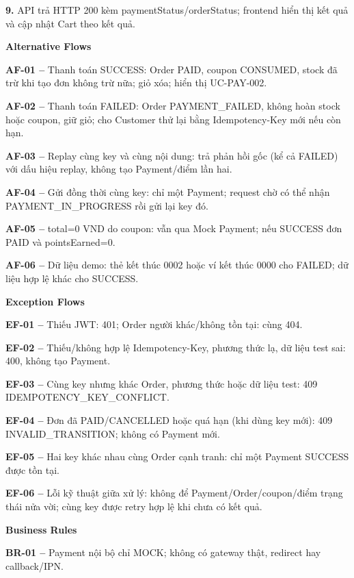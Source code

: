 \documentclass[11pt,a4paper,oneside]{report}
\begin{document}
\textbf{9.} API trả HTTP 200 kèm paymentStatus/orderStatus; frontend hiển thị kết quả và cập nhật Cart theo kết quả.
\par

\par\smallskip\noindent\textcolor{sgublue}{\textbf{Alternative Flows}}\par\nobreak
\textbf{AF-01 --} Thanh toán SUCCESS: Order PAID, coupon CONSUMED, stock đã trừ khi tạo đơn không trừ nữa; giỏ xóa; hiển thị UC-PAY-002.

\textbf{AF-02 --} Thanh toán FAILED: Order PAYMENT\_FAILED, không hoàn stock hoặc coupon, giữ giỏ; cho Customer thử lại bằng Idempotency-Key mới nếu còn hạn.

\textbf{AF-03 --} Replay cùng key và cùng nội dung: trả phản hồi gốc (kể cả FAILED) với dấu hiệu replay, không tạo Payment/điểm lần hai.

\textbf{AF-04 --} Gửi đồng thời cùng key: chỉ một Payment; request chờ có thể nhận PAYMENT\_IN\_PROGRESS rồi gửi lại key đó.

\textbf{AF-05 --} total=0 VND do coupon: vẫn qua Mock Payment; nếu SUCCESS đơn PAID và pointsEarned=0.

\textbf{AF-06 --} Dữ liệu demo: thẻ kết thúc 0002 hoặc ví kết thúc 0000 cho FAILED; dữ liệu hợp lệ khác cho SUCCESS.
\par

\par\smallskip\noindent\textcolor{sgublue}{\textbf{Exception Flows}}\par\nobreak
\textbf{EF-01 --} Thiếu JWT: 401; Order người khác/không tồn tại: cùng 404.

\textbf{EF-02 --} Thiếu/không hợp lệ Idempotency-Key, phương thức lạ, dữ liệu test sai: 400, không tạo Payment.

\textbf{EF-03 --} Cùng key nhưng khác Order, phương thức hoặc dữ liệu test: 409 IDEMPOTENCY\_KEY\_CONFLICT.

\textbf{EF-04 --} Đơn đã PAID/CANCELLED hoặc quá hạn (khi dùng key mới): 409 INVALID\_TRANSITION; không có Payment mới.

\textbf{EF-05 --} Hai key khác nhau cùng Order cạnh tranh: chỉ một Payment SUCCESS được tồn tại.

\textbf{EF-06 --} Lỗi kỹ thuật giữa xử lý: không để Payment/Order/coupon/điểm trạng thái nửa vời; cùng key được retry hợp lệ khi chưa có kết quả.
\par

\par\smallskip\noindent\textcolor{sgublue}{\textbf{Business Rules}}\par\nobreak
\textbf{BR-01 --} Payment nội bộ chỉ MOCK; không có gateway thật, redirect hay callback/IPN.
\end{document}
